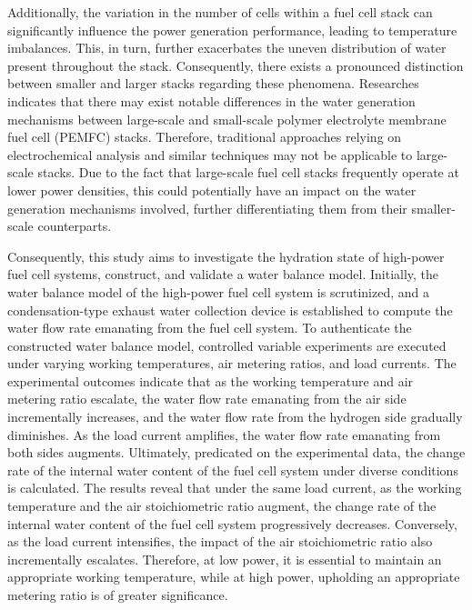 \par
Additionally, the variation in the number of cells within a fuel cell stack can significantly influence the power generation performance, leading to temperature imbalances\cite{millerReviewPolymerElectrolyte2011}. This, in turn, further exacerbates the uneven distribution of water present throughout the stack. Consequently, there exists a pronounced distinction between smaller and larger stacks regarding these phenomena.
Researches indicates that there may exist notable differences in the water generation mechanisms between large-scale and small-scale polymer electrolyte membrane fuel cell (PEMFC) stacks\cite{jiReviewWaterManagement2009}. Therefore, traditional approaches relying on electrochemical analysis and similar techniques may not be applicable to large-scale stacks. Due to the fact that large-scale fuel cell stacks frequently operate at lower power densities\cite{shojayianSimulationCathodeCatalyst2024}, this could potentially have an impact on the water generation mechanisms involved, further differentiating them from their smaller-scale counterparts.

\par
Consequently, this study aims to investigate the hydration state of high-power fuel cell systems, construct, and validate a water balance model. Initially, the water balance model of the high-power fuel cell system is scrutinized, and a condensation-type exhaust water collection device is established to compute the water flow rate emanating from the fuel cell system.
To authenticate the constructed water balance model, controlled variable experiments are executed under varying working temperatures, air metering ratios, and load currents. The experimental outcomes indicate that as the working temperature and air metering ratio escalate, the water flow rate emanating from the air side incrementally increases, and the water flow rate from the hydrogen side gradually diminishes.
As the load current amplifies, the water flow rate emanating from both sides augments. Ultimately, predicated on the experimental data, the change rate of the internal water content of the fuel cell system under diverse conditions is calculated. The results reveal that under the same load current, as the working temperature and the air stoichiometric ratio augment, the change rate of the internal water content of the fuel cell system progressively decreases.
Conversely, as the load current intensifies, the impact of the air stoichiometric ratio also incrementally escalates. Therefore, at low power, it is essential to maintain an appropriate working temperature, while at high power, upholding an appropriate metering ratio is of greater significance.

